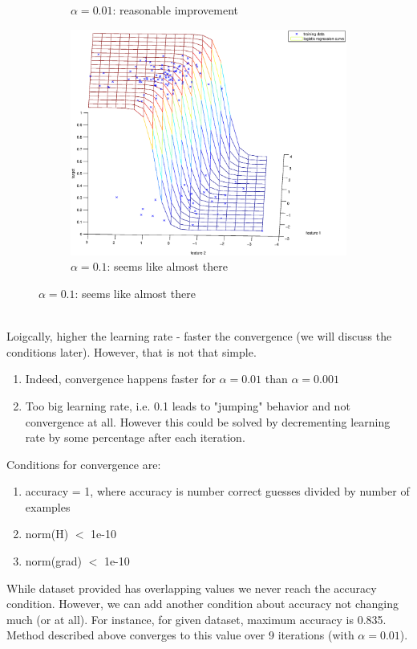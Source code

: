 \documentclass{article}
\begin{document}
\begin{figure}[h]
\begin{subfigure}{.5\textwidth}
			\caption{$\alpha = 0.01$: reasonable improvement}
			\label{fig:sub2}
		\end{subfigure}
		\begin{subfigure}{.5\textwidth}
			\centering
			\includegraphics[width=.9\linewidth]{lr_provided_start_1.eps}
			\caption{$\alpha = 0.1$: seems like almost there}
			\label{fig:sub2}
		\end{subfigure}
	\end{figure}	
	\\Loigcally, higher the learning rate - faster the convergence (we will discuss the conditions later). However, that is not that simple.
	\begin{enumerate}
		\item Indeed, convergence happens faster for $\alpha = 0.01$ than $\alpha = 0.001$
		\item Too big learning rate, i.e. 0.1 leads to "jumping" behavior and not convergence at all. However this could be solved by decrementing learning rate by some percentage after each iteration.
	\end{enumerate}
	Conditions for convergence are:
	\begin{enumerate}
		\item accuracy = 1, where accuracy is number correct guesses divided by number of examples
		\item norm(H) $<$ 1e-10 
		\item norm(grad) $<$ 1e-10
	\end{enumerate}
	While dataset provided has overlapping values we never reach the accuracy condition. However, we can add another condition about accuracy not changing much (or at all). For instance, for given dataset, maximum accuracy is 0.835. Method described above converges to this value over 9 iterations (with $\alpha = 0.01$).
	
\end{document}
